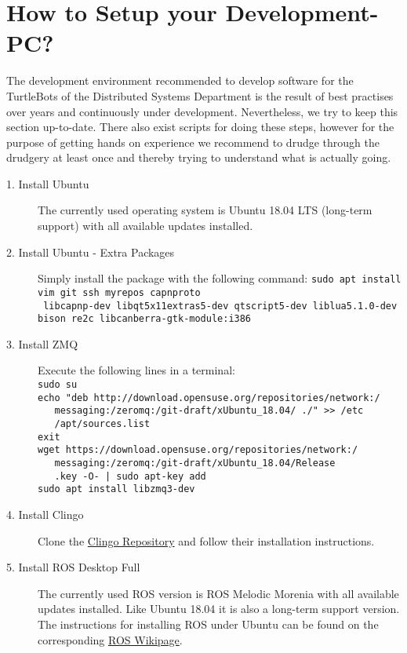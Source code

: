 \section{How to Setup your Development-PC?}
\label{sec:SetupPC}

The development environment recommended to develop software for the TurtleBots of the Distributed Systems Department is the result of best practises over years and continuously under development. Nevertheless, we try to keep this section up-to-date. There also exist scripts for doing these steps, however for the purpose of getting hands on experience we recommend to drudge through the drudgery at least once and thereby trying to understand what is actually going.

\begin{description}
	\item[1. Install Ubuntu] The currently used operating system is Ubuntu 18.04 LTS (long-term support) with all available updates installed.
	\item[2. Install Ubuntu - Extra Packages] Simply install the package with the following command: \verb#sudo apt install vim git ssh myrepos capnproto#\\\verb# libcapnp-dev libqt5x11extras5-dev qtscript5-dev liblua5.1.0-dev #\\\verb#bison re2c libcanberra-gtk-module:i386#
	\item[3. Install ZMQ] Execute the following lines in a terminal:\\
\verb#sudo su#\\
\verb#echo "deb http://download.opensuse.org/repositories/network:/#\\\verb#   messaging:/zeromq:/git-draft/xUbuntu_18.04/ ./" >> /etc#\\\verb#   /apt/sources.list#\\
\verb#exit#\\
\verb#wget https://download.opensuse.org/repositories/network:/#\\\verb#   messaging:/zeromq:/git-draft/xUbuntu_18.04/Release#\\\verb#   .key -O- | sudo apt-key add#\\
\verb#sudo apt install libzmq3-dev#
	\item[4. Install Clingo] Clone the \href{https://github.com/potassco/clingo}{Clingo Repository} and follow their installation instructions.
	\item[5. Install ROS Desktop Full] The currently used ROS version is ROS Melodic Morenia with all available updates installed. Like Ubuntu 18.04 it is also a long-term support version. The instructions for installing ROS under Ubuntu can be found on the corresponding \href{http://wiki.ros.org/melodic/Installation/Ubuntu}{ROS Wikipage}.

\end{description}
